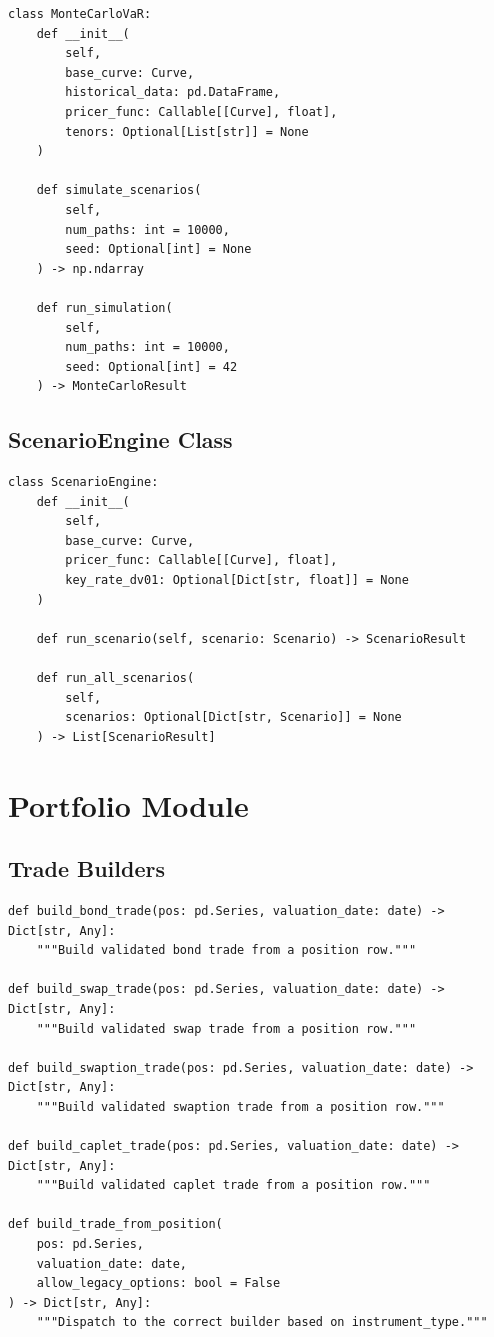 \documentclass[12pt,a4paper]{report}
\begin{document}
\begin{lstlisting}
class MonteCarloVaR:
    def __init__(
        self,
        base_curve: Curve,
        historical_data: pd.DataFrame,
        pricer_func: Callable[[Curve], float],
        tenors: Optional[List[str]] = None
    )
    
    def simulate_scenarios(
        self,
        num_paths: int = 10000,
        seed: Optional[int] = None
    ) -> np.ndarray
    
    def run_simulation(
        self,
        num_paths: int = 10000,
        seed: Optional[int] = 42
    ) -> MonteCarloResult
\end{lstlisting}

\subsection{ScenarioEngine Class}

\begin{lstlisting}
class ScenarioEngine:
    def __init__(
        self,
        base_curve: Curve,
        pricer_func: Callable[[Curve], float],
        key_rate_dv01: Optional[Dict[str, float]] = None
    )
    
    def run_scenario(self, scenario: Scenario) -> ScenarioResult
    
    def run_all_scenarios(
        self,
        scenarios: Optional[Dict[str, Scenario]] = None
    ) -> List[ScenarioResult]
\end{lstlisting}

\section{Portfolio Module}

\subsection{Trade Builders}

\begin{lstlisting}
def build_bond_trade(pos: pd.Series, valuation_date: date) -> Dict[str, Any]:
    """Build validated bond trade from a position row."""

def build_swap_trade(pos: pd.Series, valuation_date: date) -> Dict[str, Any]:
    """Build validated swap trade from a position row."""

def build_swaption_trade(pos: pd.Series, valuation_date: date) -> Dict[str, Any]:
    """Build validated swaption trade from a position row."""

def build_caplet_trade(pos: pd.Series, valuation_date: date) -> Dict[str, Any]:
    """Build validated caplet trade from a position row."""

def build_trade_from_position(
    pos: pd.Series,
    valuation_date: date,
    allow_legacy_options: bool = False
) -> Dict[str, Any]:
    """Dispatch to the correct builder based on instrument_type."""
\end{lstlisting}
\end{document}
